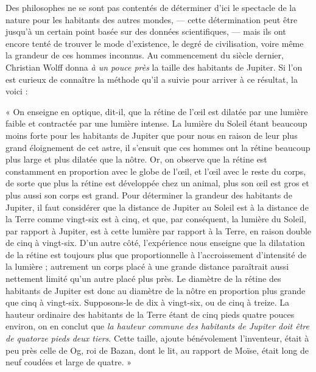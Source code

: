 \documentclass[a4paper, 11pt, oneside]{article}
\begin{document}
Des philosophes ne se sont pas contentés de déterminer d'ici le spectacle de la nature pour les habitants des autres mondes, --- cette détermination peut être jusqu'à un certain point basée sur des données scientifiques, --- mais ils ont encore tenté de trouver le mode d'existence, le degré de civilisation, voire même la grandeur de ces hommes inconnus. Au commencement du siècle dernier, Christian Wolff donna \emph{à un pouce près} la taille des habitants de Jupiter. Si l'on est curieux de connaître la méthode qu'il a suivie pour arriver à ce résultat, la voici :

« On enseigne en optique, dit-il, que la rétine de l'œil est dilatée par une lumière faible et contractée par une lumière intense. La lumière du Soleil étant beaucoup moins forte pour les habitants de Jupiter que pour nous en raison de leur plus grand éloignement de cet astre, il s'ensuit que ces hommes ont la rétine beaucoup plus large et plus dilatée que la nôtre. Or, on observe que la rétine est constamment en proportion avec le globe de l'œil, et l'œil avec le reste du corps, de sorte que plus la rétine est développée chez un animal, plus son œil est gros et plus aussi son corps est grand. Pour déterminer la grandeur des habitants de Jupiter, il faut considérer que la distance de Jupiter au Soleil est à la distance de la Terre comme vingt-six est à cinq, et que, par conséquent, la lumière du Soleil, par rapport à Jupiter, est à cette lumière par rapport à la Terre, en raison double de cinq à vingt-six. D'un autre côté, l'expérience nous enseigne que la dilatation de la rétine est toujours plus que proportionnelle à l'accroissement d'intensité de la lumière ; autrement un corps placé à une grande distance paraîtrait aussi nettement limité qu'un autre placé plus près. Le diamètre de la rétine des habitants de Jupiter est donc au diamètre de la nôtre en proportion plus grande que cinq à vingt-six. Supposons-le de dix à vingt-six, ou de cinq à treize. La hauteur ordinaire des habitants de la Terre étant de cinq pieds quatre pouces environ, on en conclut que \emph{la hauteur commune des habitants de Jupiter doit être de quatorze pieds deux tiers}. Cette taille, ajoute bénévolement l'inventeur, était à peu près celle de Og, roi de Bazan, dont le lit, au rapport de Moïse, était long de neuf coudées et large de quatre. »
\end{document}
